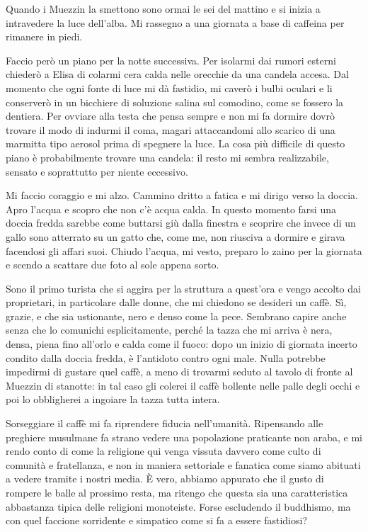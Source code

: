 Quando i Muezzin la smettono sono ormai le sei del mattino e si inizia a intravedere la luce dell'alba. Mi rassegno a una giornata a base di caffeina per rimanere in piedi.

Faccio però un piano per la notte successiva. Per isolarmi dai rumori esterni chiederò a Elisa di colarmi cera calda nelle orecchie da una candela accesa. Dal momento che ogni fonte di luce mi dà fastidio, mi caverò i bulbi oculari e li conserverò in un bicchiere di soluzione salina sul comodino, come se fossero la dentiera. Per ovviare alla testa che pensa sempre e non mi fa dormire dovrò trovare il modo di indurmi il coma, magari attaccandomi allo scarico di una marmitta tipo aerosol prima di spegnere la luce. La cosa più difficile di questo piano è probabilmente trovare una candela: il resto mi sembra realizzabile, sensato e soprattutto per niente eccessivo.

Mi faccio coraggio e mi alzo. Cammino dritto a fatica e mi dirigo verso la doccia. Apro l'acqua e scopro che non c'è acqua calda. In questo momento farsi una doccia fredda sarebbe come buttarsi giù dalla finestra e scoprire che invece di un gallo sono atterrato su un gatto che, come me, non riusciva a dormire e girava facendosi gli affari suoi. Chiudo l'acqua, mi vesto, preparo lo zaino per la giornata e scendo a scattare due foto al sole appena sorto.

Sono il primo turista che si aggira per la struttura a quest'ora e vengo accolto dai proprietari, in particolare dalle donne, che mi chiedono se desideri un caffè. Sì, grazie, e che sia ustionante, nero e denso come la pece. Sembrano capire anche senza che lo comunichi esplicitamente, perché la tazza che mi arriva è nera, densa, piena fino all'orlo e calda come il fuoco: dopo un inizio di giornata incerto condito dalla doccia fredda, è l'antidoto contro ogni male. Nulla potrebbe impedirmi di gustare quel caffè, a meno di trovarmi seduto al tavolo di fronte al Muezzin di stanotte: in tal caso gli colerei il caffè bollente nelle palle degli occhi e poi lo obbligherei a ingoiare la tazza tutta intera.

Sorseggiare il caffè mi fa riprendere fiducia nell'umanità. Ripensando alle preghiere musulmane fa strano vedere una popolazione praticante non araba, e mi rendo conto di come la religione qui venga vissuta davvero come culto di comunità e fratellanza, e non in maniera settoriale e fanatica come siamo abituati a vedere tramite i nostri media. È vero, abbiamo appurato che il gusto di rompere le balle al prossimo resta, ma ritengo che questa sia una caratteristica abbastanza tipica delle religioni monoteiste. Forse escludendo il buddhismo, ma con quel faccione sorridente e simpatico come si fa a essere fastidiosi?

